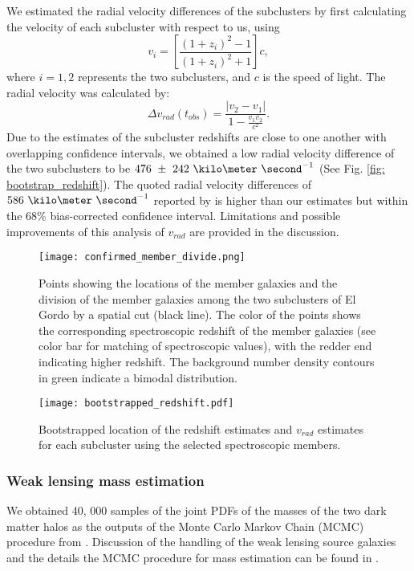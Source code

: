 We estimated the radial velocity differences of the
subclusters by first calculating the velocity of each subcluster with
respect to us, using  
\begin{equation}
	v_i = \left[ \frac{(1+z_i)^2 - 1 }{(1+z_i)^2 + 1 }\right]c,
\end{equation}
where $i=1, 2$ represents the two subclusters, and $c$ is the speed of
light. The radial velocity was calculated by: 
\begin{equation}
	\Delta v_{rad}(t_{obs}) = \frac{|v_2 - v_1|}{1-\frac{v_1 v_2}{c^2}}.
\end{equation}
Due to the estimates of the subcluster redshifts are close to
one another with overlapping confidence intervals, we obtained a low 
radial velocity difference of the two subclusters to be
$476~\pm~242~\kilo\meter~\second^{-1}$ (See Fig. \ref{fig:
bootstrap_redshift}). 
The quoted radial velocity differences of $586~\kilo \meter~\second^{-1}$ reported by  
is higher than our estimates but within the 68\% bias-corrected
confidence interval. Limitations and possible improvements of this analysis
of $v_{rad}$ are provided in the discussion. 
\begin{figure}
	\texttt{[image: confirmed\_member\_divide.png]}
	\caption{\label{fig:membership} Points showing the locations of the
	member galaxies and the division of the member galaxies among the two subclusters of El Gordo by a spatial cut
(black line). The color of the points shows the corresponding spectroscopic
redshift of the member galaxies (see color bar for matching of
spectroscopic values), with the redder end indicating higher
redshift. The background number density contours in green indicate a bimodal
distribution.} 
\end{figure}
\begin{figure}
	\texttt{[image: bootstrapped\_redshift.pdf]}
	\caption{\label{fig: bootstrap_redshift} Bootstrapped location of the
	redshift estimates and $v_{rad}$ estimates for each subcluster using the selected spectroscopic members.  
} 
\end{figure}
\subsubsection{Weak lensing mass estimation} 
We obtained 40, 000 samples of the joint PDFs of the masses of the two dark
matter halos as the outputs of the Monte Carlo Markov Chain (MCMC)
procedure from \citealt{Jee13}. Discussion of the handling of the weak
lensing source galaxies and the details the MCMC procedure for mass
estimation can be found in \citealt{Jee13}. 
